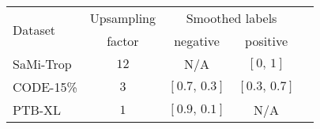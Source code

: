 \begin{tabular}{lcccc}
\toprule
\multirow{2}{*}{Dataset} & Upsampling & \multicolumn{2}{c}{Smoothed labels} \\ \cmidrule(lr){3-4}
& factor & negative & positive \\
\midrule
SaMi-Trop & $12$ & N/A          & $[0,\,1]$     \\
CODE-15\% & $3$ & $[0.7,\,0.3]$ & $[0.3,\,0.7]$ \\
PTB-XL    & $1$ & $[0.9,\,0.1]$ & N/A           \\
\bottomrule
\end{tabular}